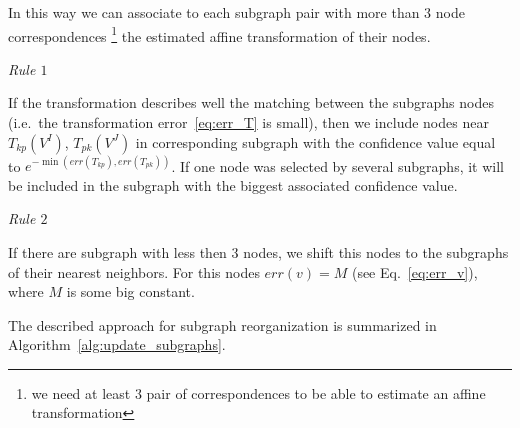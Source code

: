 \documentclass[
	fontsize=12pt,
	paper=a4,
	twoside=false,
	numbers=noenddot,
	plainheadsepline,
	toc=listof,
	toc=bibliography
]{scrartcl}
\begin{document}
In this way we can associate to each subgraph pair with more than $3$ node correspondences \footnote{we need at least $3$ pair of correspondences to be able to estimate an affine transformation} the estimated affine transformation of their nodes.

\textit{Rule $1$}

If the transformation describes well the matching between the subgraphs nodes (i.e.\ the transformation error~\ref{eq:err_T} is small), then we include nodes near $T_{kp}(V^I)$, $T_{pk}(V^J)$ in corresponding subgraph with the confidence value equal to $e^{-\min(err(T_{kp}), err(T_{pk}))}$. If one node was selected by several subgraphs, it will be included in the subgraph with the biggest associated confidence value.

\textit{Rule $2$}

If there are subgraph with less then $3$ nodes, we shift this nodes to the subgraphs of their nearest neighbors. For this nodes $err(v)=M$ (see Eq.~\ref{eq:err_v}), where $M$ is some big constant. 

The described approach for subgraph reorganization is summarized in Algorithm~\ref{alg:update_subgraphs}.
\end{document}
